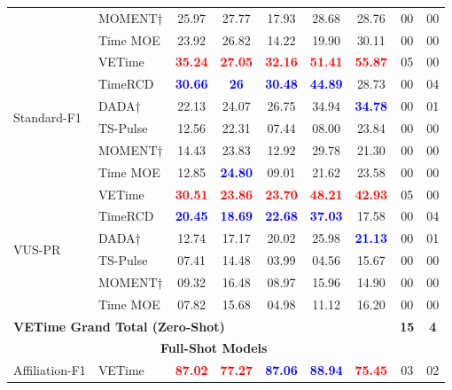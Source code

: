 \documentclass{article}
\theoremstyle{plain}
\theoremstyle{definition}
\theoremstyle{remark}
\begin{document}
\begin{table}[t!]
\begin{tabular}{l|l|ccccc|c|c}
    & MOMENT† & 25.97 \rlap{*}  & 27.77 & 17.93 \rlap{*}  & 28.68 \rlap{*}  & 28.76 & 00 & 00 \\
    & Time MOE & 23.92 & 26.82 & 14.22 & 19.90 & 30.11 & 00 & 00 \\
    \hline
    \multirow{6}{*}{Standard-F1} 
    & VETime & \textcolor{red}{\textbf{35.24}} & \textcolor{red}{\textbf{27.05}} & \textcolor{red}{\textbf{32.16}} & \textcolor{red}{\textbf{51.41}} & \textcolor{red}{\textbf{55.87}} & 05 & 00 \\
    & TimeRCD & \textcolor{blue}{\textbf{30.66}} & \textcolor{blue}{\textbf{26}} & \textcolor{blue}{\textbf{30.48}} & \textcolor{blue}{\textbf{44.89}} & 28.73 & 00 & 04 \\ 
    & DADA† & 22.13 & 24.07 & 26.75& 34.94 & \textcolor{blue}{\textbf{34.78}} & 00 & 01 \\
    & TS-Pulse & 12.56 & 22.31 & 07.44 & 08.00 & 23.84 & 00 & 00 \\
    & MOMENT† & 14.43 \rlap{*}  & 23.83 & 12.92 \rlap{*}  & 29.78 \rlap{*}  & 21.30 & 00 & 00 \\
    & Time MOE & 12.85 & \textcolor{blue}{\textbf{24.80}} & 09.01 & 21.62 & 23.58 & 00 & 00 \\
    \hline
    \multirow{6}{*}{VUS-PR} 
    & VETime & \textcolor{red}{\textbf{30.51}} & \textcolor{red}{\textbf{23.86}} & \textcolor{red}{\textbf{23.70}} & \textcolor{red}{\textbf{48.21}} & \textcolor{red}{\textbf{42.93}} & 05 & 00 \\
    & TimeRCD & \textcolor{blue}{\textbf{20.45}} & \textcolor{blue}{\textbf{18.69}} & \textcolor{blue}{\textbf{22.68}} & \textcolor{blue}{\textbf{37.03}} & 17.58 & 00 & 04 \\ 
    & DADA† & 12.74 & 17.17 & 20.02 & 25.98 & \textcolor{blue}{\textbf{21.13}} & 00& 01 \\
    & TS-Pulse & 07.41 & 14.48 & 03.99 & 04.56 & 15.67 & 00 & 00 \\
    & MOMENT† & 09.32 \rlap{*}  & 16.48 & 08.97 \rlap{*}  & 15.96 \rlap{*}  & 14.90 & 00 & 00 \\
    & Time MOE & 07.82 & 15.68 & 04.98 & 11.12 & 16.20 & 00 & 00 \\
    \hline
    \multicolumn{7}{l}{\textbf{VETime Grand Total (Zero-Shot)}} & \textbf{15} & \textbf{4} \\
    \hline
    \multicolumn{8}{c}{\textbf{Full-Shot Models}} \\
    \hline
    \multirow{5}{*}{Affiliation-F1} 
    & VETime & \textcolor{red}{\textbf{87.02}} & \textcolor{red}{\textbf{77.27}} & \textcolor{blue}{\textbf{87.06}} & \textcolor{blue}{\textbf{88.94}} & \textcolor{red}{\textbf{75.45}} & 03 & 02 \\

\end{tabular}
\end{table}
\end{document}
